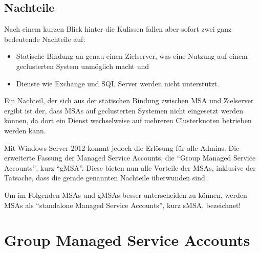       \subsection{Nachteile}
        Nach einem kurzen Blick hinter die Kulissen fallen aber sofort zwei ganz
        bedeutende Nachteile auf:
        \begin{itemize}
          \item Statische Bindung an genau einen Zielserver, was eine Nutzung auf
          einem geclusterten System unmöglich macht und
          \item Dienste wie Exchange und SQL Server werden nicht unterstützt.
        \end{itemize}
        \begin{merke}
          Ein Nachteil, der sich aus der statischen Bindung zwischen MSA und
          Zielserver ergibt ist der, dass MSAs auf geclusterten Systemen nicht
          eingesetzt werden können, da dort ein Dienst wechselweise auf mehreren
          Clusterknoten betrieben werden kann.
        \end{merke}
        Mit Windows Server 2012 kommt jedoch die Erlösung für alle Admins. Die
        erweiterte Fassung der Managed Service Accounts, die \enquote{Group
        Managed Service Accounts}, kurz \enquote{gMSA}. Diese bieten nun alle
        Vorteile der MSAs, inklusive der Tatsache, dass die gerade genannten
        Nachteile überwunden sind.
        \begin{merke}
          Um im Folgenden MSAs und gMSAs besser unterscheiden zu können, werden
          MSAs als \enquote{standalone Managed Service Accounts}, kurz sMSA,
          bezeichnet!
        \end{merke}
    \section{Group Managed Service Accounts}
